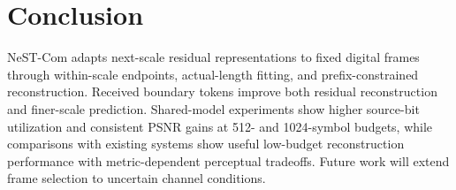 \section{Conclusion}
NeST-Com adapts next-scale residual representations to fixed digital frames through within-scale endpoints, actual-length fitting, and prefix-constrained reconstruction. Received boundary tokens improve both residual reconstruction and finer-scale prediction. Shared-model experiments show higher source-bit utilization and consistent PSNR gains at 512- and 1024-symbol budgets, while comparisons with existing systems show useful low-budget reconstruction performance with metric-dependent perceptual tradeoffs. Future work will extend frame selection to uncertain channel conditions.
